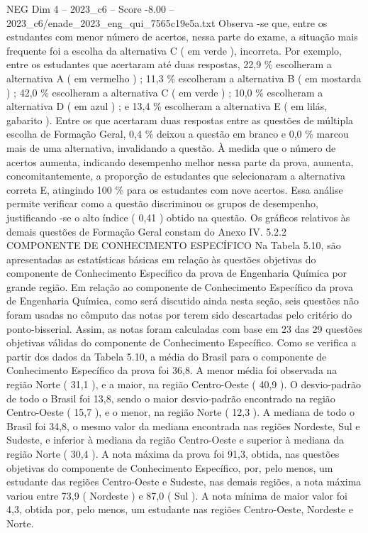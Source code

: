 \begin{textsample}{NEG Dim 4 – 2023\_c6 – Score -8.00 – 2023\_c6/enade\_2023\_eng\_qui\_7565c19e5a.txt}
Observa -se que, entre os estudantes com menor número de acertos, nessa parte do exame, a situação mais frequente foi a escolha da alternativa C ( em verde ), incorreta.
Por exemplo, entre os estudantes que acertaram até duas respostas, 22,9 \% escolheram a alternativa A ( em vermelho ) ; 11,3 \% escolheram a alternativa B ( em mostarda ) ; 42,0 \% escolheram a alternativa C ( em verde ) ; 10,0 \% escolheram a alternativa D ( em azul ) ; e 13,4 \% escolheram a alternativa E ( em lilás, gabarito ).
Entre os que acertaram duas respostas entre as questões de múltipla escolha de Formação Geral, 0,4 \% deixou a questão em branco e 0,0 \% marcou mais de uma alternativa, invalidando a questão.
À medida que o número de acertos aumenta, indicando desempenho melhor nessa parte da prova, aumenta, concomitantemente, a proporção de estudantes que selecionaram a alternativa correta E, atingindo 100 \% para os estudantes com nove acertos.
Essa análise permite verificar como a questão discriminou os grupos de desempenho, justificando -se o alto índice ( 0,41 ) obtido na questão.
Os gráficos relativos às demais questões de Formação Geral constam do Anexo IV. 5.2.2 COMPONENTE DE CONHECIMENTO ESPECÍFICO Na Tabela 5.10, são apresentadas as estatísticas básicas em relação às questões objetivas do componente de Conhecimento Específico da prova de Engenharia Química por grande região.
Em relação ao componente de Conhecimento Específico da prova de Engenharia Química, como será discutido ainda nesta seção, seis questões não foram usadas no cômputo das notas por terem sido descartadas pelo critério do ponto-bisserial.
Assim, as notas foram calculadas com base em 23 das 29 questões objetivas válidas do componente de Conhecimento Específico.
Como se verifica a partir dos dados da Tabela 5.10, a média do Brasil para o componente de Conhecimento Específico da prova foi 36,8.
A menor média foi observada na região Norte ( 31,1 ), e a maior, na região Centro-Oeste ( 40,9 ).
O desvio-padrão de todo o Brasil foi 13,8, sendo o maior desvio-padrão encontrado na região Centro-Oeste ( 15,7 ), e o menor, na região Norte ( 12,3 ).
A mediana de todo o Brasil foi 34,8, o mesmo valor da mediana encontrada nas regiões Nordeste, Sul e Sudeste, e inferior à mediana da região Centro-Oeste e superior à mediana da região Norte ( 30,4 ).
A nota máxima da prova foi 91,3, obtida, nas questões objetivas do componente de Conhecimento Específico, por, pelo menos, um estudante das regiões Centro-Oeste e Sudeste, nas demais regiões, a nota máxima variou entre 73,9 ( Nordeste ) e 87,0 ( Sul ).
A nota mínima de maior valor foi 4,3, obtida por, pelo menos, um estudante nas regiões Centro-Oeste, Nordeste e Norte.

\end{textsample}
